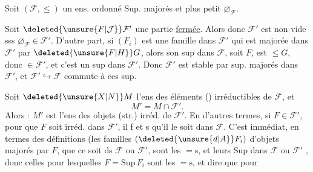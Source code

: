 
Soit $(\mathcal F,\leq)$ un ens. ordonné   $\mathrm{Sup}$. majorés et plus petit  $\varnothing_{\mathcal F}$.

Soit $\deleted{\unsure{F|\mathcal J}}\mathcal F'$ une partie \uline{fermée}. Alors donc $\mathcal F'$  est non vide sss $\varnothing_{\mathcal F}\in\mathcal F'$. D'autre part, si $(F_i)$ est une famille dans $\mathcal F'$ qui est majorée dans $\mathcal F'$ par $\deleted{\unsure{F|H}}G$, alors son sup dans $\mathcal F$, soit $F$, est $\leq G$, donc $\in\mathcal F'$, et c'est un sup dans $\mathcal F'$. Donc $\mathcal F'$ est stable par sup. majorés dans $\mathcal F'$, et $\mathcal F'\hookrightarrow\mathcal F$ commute à ces sup.

Soit $\deleted{\unsure{X|N}}M$ l'ens des éléments () irréductibles de $\mathcal F$, et
\[
M'=M\cap\mathcal F'.
\]
Alors : $M'$ est l'ens des objets (str.) irréd. de $\mathcal F'$. En d'autres termes, si $F\in\mathcal F'$, pour que $F$ soit irréd. dans $\mathcal F'$, il f et s qu'il le soit dans $\mathcal F$. C'est immédiat, en termes des définitions (les familles $(\deleted{\unsure{d|A}}F_i)$ d'objets  majorés par $F$, que ce soit ds $\mathcal F$ ou $\mathcal F'$, sont les $=\mathrm{s}$, et leurs $\mathrm{Sup}$ dans $\mathcal F$ ou $\mathcal F'$ , donc celles pour lesquelles $F=\mathrm{Sup}\,F_i$ sont les $=\mathrm{s}$, et dire que pour
